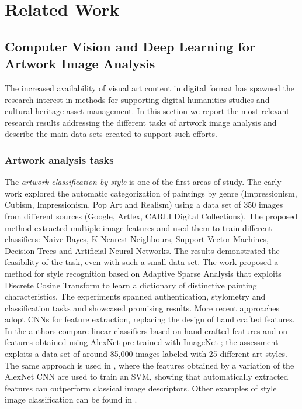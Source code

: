 \documentclass[acmlarge]{acmart}
\begin{document}
 \section{Related Work}\label{sec:relwork}

\subsection{Computer Vision and Deep Learning for Artwork Image Analysis}



The increased availability of visual art content in digital  format has spawned the research interest in methods  for supporting digital humanities studies and  cultural heritage asset management.   In this section we report the most relevant research results addressing the different tasks of artwork image analysis and describe the main data sets created to support such efforts. 



\subsubsection{Artwork analysis tasks}

The \textit{artwork classification by style} is one of the first areas of study. The early work \cite{zujovic2009classifying} explored the automatic categorization of paintings by  genre (Impressionism,  Cubism, Impressionism, Pop Art and Realism)
using a data set of 350  images from different sources (Google, Artlex, CARLI Digital Collections). The proposed method extracted multiple image features and   used them to train different classifiers: Naive Bayes, K-Nearest-Neighbours,   Support Vector Machines, Decision Trees and Artificial Neural Networks. The results demonstrated the feasibility of the task, even with such a small data set. The work \cite{gao2015adaptive} proposed a method for style recognition based on Adaptive Sparse Analysis that exploits Discrete Cosine Transform to learn a dictionary of distinctive painting characteristics. The experiments spanned  authentication, stylometry and classification tasks and showcased promising results.  More recent approaches adopt CNNs for  feature extraction, replacing the design of hand crafted features.  In  \cite{karayev2013recognizing} the authors compare linear classifiers based on hand-crafted features and  on features  obtained using  AlexNet \cite{krizhevsky2012imagenet} pre-trained with ImageNet \cite{deng2009imagenet}; the assessment exploits a data set of around 85,000 images labeled with 25 different art styles. The same approach is used in \cite{tan2016ceci}, where the features obtained by a variation of the AlexNet CNN  are used to train an SVM, showing that automatically extracted features can outperform classical image descriptors. Other examples of style image classification can be found in \cite{bar2014classification,lecoutre2017recognizing,florea2017domain, chen2017multi}.
\end{document}

